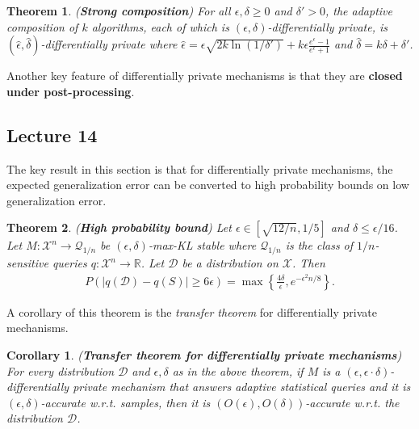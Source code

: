 \documentclass[]{article}
\newtheorem{theorem}{Theorem}[section]
\newtheorem{corollary}{Corollary}[section]
\begin{document}
\begin{theorem} (\textbf{Strong composition})
	For all $\epsilon,\delta \ge 0$ and $\delta' > 0$, the adaptive composition of $k$ algorithms, each of which is $(\epsilon,\delta)$-differentially private, is $(\hat{\epsilon},\hat{\delta})$-differentially private where $\hat{\epsilon} = \epsilon \sqrt{2k \ln (1/\delta')} + k\epsilon \frac{e^\epsilon-1}{e^\epsilon+1}$ and $\hat{\delta}=k\delta + \delta'$.
\end{theorem}

Another key feature of differentially private mechanisms is that they are \textbf{closed under post-processing}. 

\subsection{Lecture 14}
The key result in this section is that for differentially private mechanisms, the expected generalization error can be converted to high probability bounds on low generalization error. 

\begin{theorem} (\textbf{High probability bound})
	Let $\epsilon \in [\sqrt{12/n}, 1/5]$ and $\delta \le \epsilon/16$. Let $M:\mathcal{X}^n \rightarrow \mathcal{Q}_{1/n}$ be $(\epsilon,\delta)$-max-KL stable where $\mathcal{Q}_{1/n}$ is the class of $1/n$-sensitive queries $q:\mathcal{X}^n \rightarrow \mathbb{R}$. Let $\mathcal{D}$ be a distribution on $\mathcal{X}$. Then 
	\begin{align*}
		P\left(|q(\mathcal{D}) - q(S)| \ge 6 \epsilon \right) = \max \left\{\frac{4\delta}{\epsilon}, e^{-\epsilon^2n/8} \right\}.
	\end{align*}
\end{theorem}

A corollary of this theorem is the \textit{transfer theorem} for differentially private mechanisms. 

\begin{corollary} (\textbf{Transfer theorem for differentially private mechanisms})
	For every distribution $\mathcal{D}$ and $\epsilon,\delta$ as in the above theorem, if $M$ is a $(\epsilon,\epsilon \cdot \delta)$-differentially private mechanism that answers adaptive statistical queries and it is $(\epsilon,\delta)$-accurate w.r.t. samples, then it is $(O(\epsilon),O(\delta))$-accurate w.r.t. the distribution $\mathcal{D}$.
\end{corollary}
\end{document}
